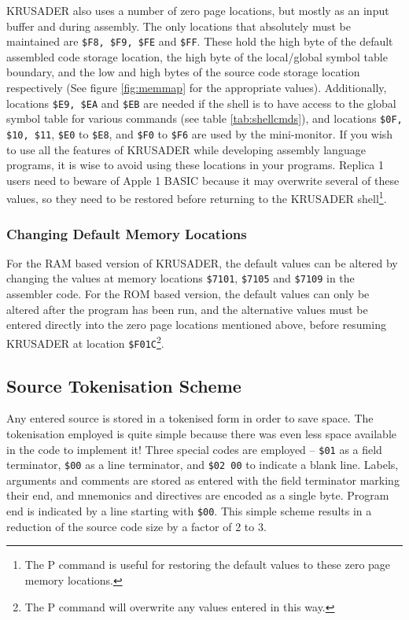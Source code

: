 \documentclass[12pt]{article}
\newcommand{\replica}[1]{\textsf{#1}}
\newcommand{\krusader}{\textsf{KRUSADER}\xspace}
\begin{document}
\krusader also
uses a number of zero page locations, but mostly as an input buffer and during assembly.  The only
locations that absolutely must be maintained are \texttt{\$F8, \$F9, \$FE} and \texttt{\$FF}.  These hold
the high byte of the default assembled code storage location, the high byte of the local/global
symbol table boundary, and the low and high bytes of the source code storage location respectively
(See figure \ref{fig:memmap} for the appropriate values).
Additionally, locations \texttt{\$E9, \$EA} and \texttt{\$EB} are needed if the shell is to have access to the global symbol
table for various commands (see table \ref{tab:shellcmds}), and locations \texttt{\$0F, \$10, \$11}, \texttt{\$E0} to \texttt{\$E8},
and \texttt{\$F0} to \texttt{\$F6} are used by the mini-monitor. If you wish to use all the features of
\krusader while developing assembly language programs, it is wise to avoid using these locations in your programs.
Replica 1 users need to beware of Apple 1 BASIC because it may overwrite several of these values, so they need to 
be restored before returning to the \krusader shell\footnote{The \replica{P} command is useful 
for restoring the default values to these zero page memory locations.}.  


\subsubsection{Changing Default Memory Locations}
\label{sec:mem_defaults}
For the RAM based version of \krusader, the default values can be altered by changing the values at memory locations \texttt{\$7101}, \texttt{\$7105} and \texttt{\$7109} in the assembler code.
For the ROM based version, the default values can only be altered after the program has been run, and the alternative values must be entered directly into the zero page locations mentioned above, before resuming \krusader at location 
\texttt{\$F01C}\footnote{The \replica{P} command will overwrite any values entered in this way.}.

\subsection{Source Tokenisation Scheme}
\label{sec:token}

Any entered source is stored in a tokenised form in order to save space.  The tokenisation
employed is quite simple because there was even less space available in the code to implement it!
Three special codes are employed -- \texttt{\$01} as a field terminator, 
\texttt{\$00} as a line terminator, and \texttt{\$02 00} to indicate a blank line.
Labels, arguments and comments are stored as entered with the field terminator marking their end, 
and mnemonics and directives are encoded as a single byte.  Program end is indicated by a line
starting with \texttt{\$00}.  
This simple scheme results in a reduction of the source code size by a factor of 2 to 3.
\end{document}
